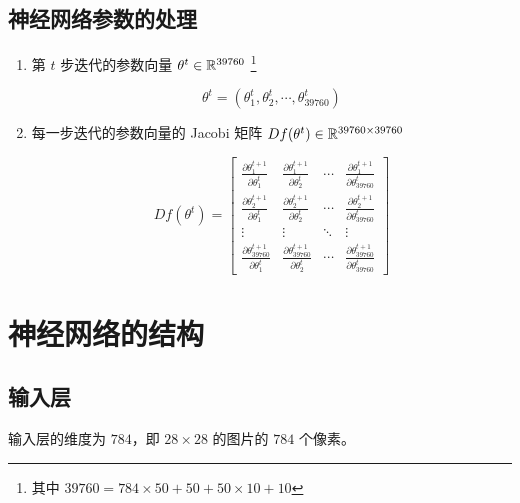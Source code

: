 \documentclass[12pt,a4paper]{amsart}
\begin{document}
\subsection{神经网络参数的处理}

\begin{enumerate}
	\item 第 $t$ 步迭代的参数向量 $\theta^t \in \mathbb{R}^{39760}$ \footnote{其中 $39760 = 784 \times 50 + 50 + 50 \times 10 + 10$}

	\begin{equation}
		\theta^t = (\theta_1^t, \theta_2^t, \cdots, \theta_{39760}^t)
	\end{equation}

	\item 每一步迭代的参数向量的 Jacobi 矩阵 $Df(\theta^t) \in \mathbb{R}^{39760 \times 39760}$

	\begin{equation}
		Df(\theta^t) = \begin{bmatrix}
			\frac{\partial \theta_1^{t+1}}{\partial \theta_1^t} & \frac{\partial \theta_1^{t+1}}{\partial \theta_2^t} & \cdots & \frac{\partial \theta_1^{t+1}}{\partial \theta_{39760}^t} \\
			\frac{\partial \theta_2^{t+1}}{\partial \theta_1^t} & \frac{\partial \theta_2^{t+1}}{\partial \theta_2^t} & \cdots & \frac{\partial \theta_2^{t+1}}{\partial \theta_{39760}^t} \\
			\vdots                                              & \vdots                                              & \ddots & \vdots                                              \\
			\frac{\partial \theta_{39760}^{t+1}}{\partial \theta_1^t} & \frac{\partial \theta_{39760}^{t+1}}{\partial \theta_2^t} & \cdots & \frac{\partial \theta_{39760}^{t+1}}{\partial \theta_{39760}^t}
		\end{bmatrix}
	\end{equation}
		
\end{enumerate}

\section{神经网络的结构}

\subsection{输入层}

输入层的维度为 $784$，即 $28 \times 28$ 的图片的 $784$ 个像素。
\end{document}
